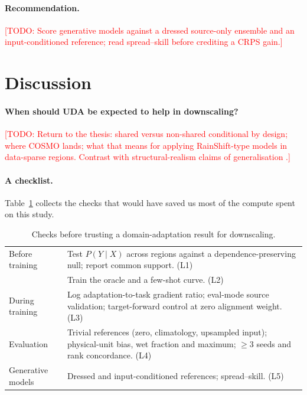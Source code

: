 \documentclass{article}
\newcommand{\todo}[1]{\textcolor{red}{[TODO: #1]}}
\begin{document}
\paragraph{Recommendation.} \todo{Score generative models against a
dressed source-only ensemble and an input-conditioned reference; read
spread--skill before crediting a CRPS gain.}

\section{Discussion}\label{sec:discussion}

\paragraph{When should UDA be expected to help in downscaling?}
\todo{Return to the thesis: shared versus non-shared conditional by
design; where COSMO lands; what that means for applying RainShift-type
models in data-sparse regions. Contrast with structural-realism claims of
generalisation \citep{glawion2025}.}

\paragraph{A checklist.} Table~\ref{tab:checklist} collects the checks
that would have saved us most of the compute spent on this study.

\begin{table}[t]
\centering\small
\begin{tabularx}{\linewidth}{lX}
\toprule
Before training & Test $P(Y\mid X)$ across regions against a
dependence-preserving null; report common support. (L1) \\
                & Train the oracle and a few-shot curve. (L2) \\
During training & Log adaptation-to-task gradient ratio; eval-mode source
validation; target-forward control at zero alignment weight. (L3) \\
Evaluation      & Trivial references (zero, climatology, upsampled
input); physical-unit bias, wet fraction and maximum; $\geq 3$ seeds and
rank concordance. (L4) \\
Generative models & Dressed and input-conditioned references;
spread--skill. (L5) \\
\bottomrule
\end{tabularx}
\caption{Checks before trusting a domain-adaptation result for
downscaling.}
\label{tab:checklist}
\end{table}
\end{document}

